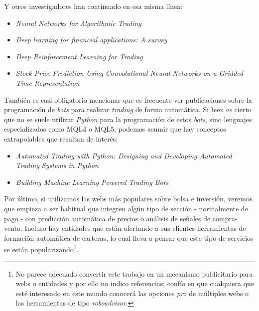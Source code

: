 Y otros investigadores han continuado en esa misma línea:

\begin{itemize}
\tightlist
\item \emph{Neural Networks for Algorithmic Trading} \citep{paper:NN_Algorithmic_Trading}
\item \emph{Deep learning for financial applications: A survey} \citep{paper:Deep_Learning_Survey}
\item \emph{Deep Reinforcement Learning for Trading} \citep{paper:Deep_Reinforcement_Trading}
\item \emph{Stock Price Prediction Using Convolutional Neural Networks on a Gridded Time Representation} \citep{paper:CNN_Stock_Prediction}
\end{itemize}


También es casi obligatorio mencionar que es frecuente ver publicaciones sobre la programación de \emph{bots} para realizar \emph{trading} de forma automática. Si bien es cierto que no se suele utilizar \emph{Python} para la programación de estos \emph{bots}, sino lenguajes especializados como MQL4 o MQL5, podemos asumir que hay conceptos extrapolables que resultan de interés:

\begin{itemize}
\tightlist
\item \emph{Automated Trading with Python: Designing and Developing Automated Trading Systems in Python} \citep{paper:Automated_Trading_Python}
\item \emph{Building Machine Learning Powered Trading Bots} \citep{paper:ML_Trading_Bots}
\end{itemize}

Por último, si utilizamos las webs más populares sobre bolsa e inversión, veremos que empieza a ser habitual que integren algún tipo de sección - normalmente de pago - con predicción automática de precios o análisis de señales de compra-venta. Incluso hay entidades que están ofertando a sus clientes herramientas de formación automática de carteras, lo cual lleva a pensar que este tipo de servicios se están popularizando\footnote{No parece adecuado convertir este trabajo en un mecanismo publicitario para webs o entidades y por ello no indico referencias; confío en que cualquiera que esté interesado en este mundo conocerá las opciones \emph{pro} de múltiples webs o las herramientas de tipo \emph{roboadvisor}.}. 